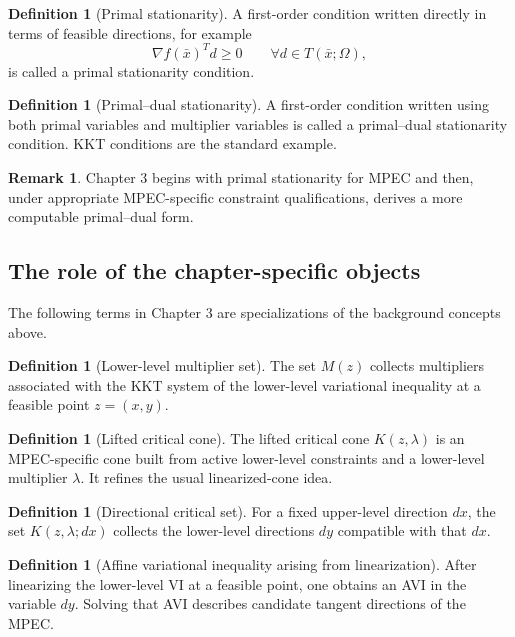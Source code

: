\documentclass[pdflatex,sn-mathphys-num]{sn-jnl}%
\theoremstyle{definition}
\newtheorem{definition}[theorem]{Definition}
\newtheorem{remark}[theorem]{Remark}
\begin{document}
\begin{definition}[Primal stationarity]
A first-order condition written directly in terms of feasible directions,
for example
\[
\nabla f(\bar x)^T d\ge 0
\qquad \forall d\in T(\bar x;\Omega),
\]
is called a primal stationarity condition.
\end{definition}

\begin{definition}[Primal--dual stationarity]
A first-order condition written using both primal variables and
multiplier variables is called a primal--dual stationarity condition.
KKT conditions are the standard example.
\end{definition}

\begin{remark}
Chapter 3 begins with primal stationarity for MPEC and then, under
appropriate MPEC-specific constraint qualifications, derives a more
computable primal--dual form.
\end{remark}

\subsection{The role of the chapter-specific objects}

The following terms in Chapter 3 are specializations of the background
concepts above.

\begin{definition}[Lower-level multiplier set]
The set $M(z)$ collects multipliers associated with the KKT system of the
lower-level variational inequality at a feasible point $z=(x,y)$.
\end{definition}

\begin{definition}[Lifted critical cone]
The lifted critical cone $K(z,\lambda)$ is an MPEC-specific cone built from
active lower-level constraints and a lower-level multiplier $\lambda$. It
refines the usual linearized-cone idea.
\end{definition}

\begin{definition}[Directional critical set]
For a fixed upper-level direction $dx$, the set $K(z,\lambda;dx)$ collects
the lower-level directions $dy$ compatible with that $dx$.
\end{definition}

\begin{definition}[Affine variational inequality arising from linearization]
After linearizing the lower-level VI at a feasible point, one obtains an AVI
in the variable $dy$. Solving that AVI describes candidate tangent
directions of the MPEC.
\end{definition}
\end{document}
